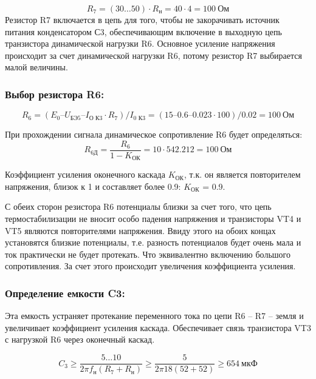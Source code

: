 \begin{equation}
\label{eq:equation3_2}
 R_{7} = (30\ldots 50)\cdot R_{н} = 40 \cdot 4 = 100~\text{Ом}
\end{equation}
Резистор R7 включается в цепь для того, чтобы не закорачивать источник питания конденсатором С3, обеспечивающим включение в выходную цепь транзистора динамической нагрузки R6. Основное усиление напряжения происходит за счет динамической нагрузки R6, потому резистор R7 выбирается малой величины.

\subsubsection{Выбор резистора R6:} 
\begin{equation}
\label{eq:equation3_3}
 R_{6} = (E_{0}– U_{\text{БЭ5}} – I_{\text{О К3}} \cdot R_7)/I_{\text{0 К3}} = (15 – 0.6 – 0.023 \cdot 100)/0.02 = 100~\text{Ом}
\end{equation}

При прохождении сигнала динамическое сопротивление R6 будет определяться:
\begin{equation}
\label{eq:equation3_4}
 R_{\text{6Д}} = \dfrac{R_6}{1-K_{\text{ОК}}} = 10 \cdot 542.212 = 100~\text{Ом}
\end{equation}

Коэффициент усиления оконечного каскада $K_{\text{ОК}}$, т.к. он является повторителем напряжения, близок к 1 и составляет более 0.9: $K_{\text{ОК}}$ = 0.9. \par
С обеих сторон резистора R6 потенциалы близки за счет того, что цепь термостабилизации не вносит особо падения напряжения и транзисторы VT4 и VT5 являются повторителями напряжения. Ввиду этого на обоих концах установятся близкие потенциалы, т.е. разность потенциалов будет очень мала и ток практически не будет протекать. Что эквивалентно включению большого сопротивления. За счет этого происходит увеличения коэффициента усиления. \par

\subsubsection{Определение емкости C3:} 
Эта емкость устраняет протекание переменного тока по цепи R6 – R7 – земля и увеличивает коэффициент усиления каскада. Обеспечивает связь транзистора VT3 с нагрузкой R6 через оконечный каскад. \par
\begin{equation}
\label{eq:equation3_5}
 C_3 \geq \dfrac{5 \ldots 10}{2 \pi f_{\text{н}} (R_7 + R_{\text{н}})} \geq \dfrac{5}{2 \pi 18 (52 + 52)} \geq 654~\text{мкФ}
\end{equation}

